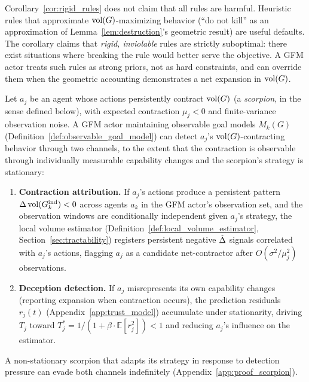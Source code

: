 Corollary~\ref{cor:rigid_rules} does not claim that all rules are harmful.
Heuristic rules that approximate $\operatorname{vol}(G)$-maximizing behavior (``do not
kill'' as an approximation of Lemma~\ref{lem:destruction}'s geometric result)
are useful defaults. The corollary claims that \emph{rigid, inviolable} rules
are strictly suboptimal: there exist situations where breaking the rule would
better serve the objective. A GFM actor treats such rules as strong priors,
not as hard constraints, and can override them when the geometric accounting
demonstrates a net expansion in $\operatorname{vol}(G)$.


\begin{proposition}
\label{prop:scorpion_detection}
Let $a_j$ be an agent whose actions persistently contract $\operatorname{vol}(G)$ (a
    \emph{scorpion}, in the sense defined below), with expected contraction
    $\mu_j < 0$ and finite-variance observation noise. A GFM actor maintaining
    observable goal models $M_k(G)$
    (Definition~\ref{def:observable_goal_model}) can detect $a_j$'s
    $\operatorname{vol}(G)$-contracting behavior through two channels, to the extent that the
    contraction is observable through individually measurable capability
    changes and the scorpion's strategy is stationary:
\begin{enumerate}
\item[\textbf{(a)}] \textbf{Contraction attribution.} If $a_j$'s actions produce a persistent pattern $\Delta \operatorname{vol}(G_{k}^{\mathrm{ind}}) < 0$ across agents $a_k$ in the GFM actor's observation set, and the observation windows are conditionally independent given $a_j$'s strategy, the local volume estimator (Definition~\ref{def:local_volume_estimator}, Section~\ref{sec:tractability}) registers persistent negative $\hat{\Delta}$ signals correlated with $a_j$'s actions, flagging $a_j$ as a candidate net-contractor after $O(\sigma^2 / \mu_j^2)$ observations.
\item[\textbf{(b)}] \textbf{Deception detection.} If $a_j$ misrepresents its own capability changes (reporting expansion when contraction occurs), the prediction residuals $r_j(t)$ (Appendix~\ref{app:trust_model}) accumulate under stationarity, driving $T_j$ toward $T_j^* = 1/(1 + \beta \cdot \mathbb{E}[r_j^2]) < 1$ and reducing $a_j$'s influence on the estimator.
\end{enumerate}
A non-stationary scorpion that adapts its strategy in response to detection
    pressure can evade both channels indefinitely
    (Appendix~\ref{app:proof_scorpion}).
\end{proposition}


